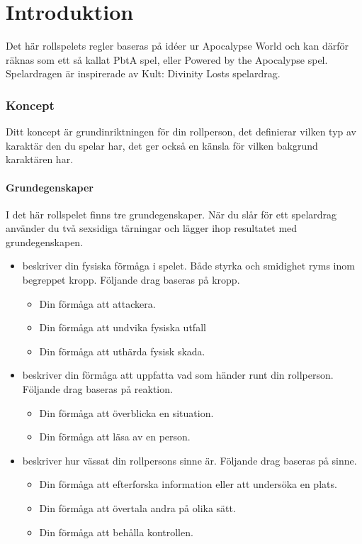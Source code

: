 \newcommand{\MyTitle}{Spelarbok}



\maketitle
\clearpage
\part{Introduktion}
Det här rollspelets regler baseras på idéer ur Apocalypse World och kan därför räknas som ett så kallat PbtA spel, eller Powered by the Apocalypse spel. Spelardragen är inspirerade av Kult: Divinity Losts spelardrag.
\section{Koncept}
Ditt koncept är grundinriktningen för din rollperson, det definierar vilken typ av karaktär den du spelar har, det ger också en känsla för vilken bakgrund karaktären har.
\subsection{Grundegenskaper}
I det här rollspelet finns tre grundegenskaper. När du slår för ett spelardrag använder du två sexsidiga tärningar och lägger ihop resultatet med grundegenskapen.
\begin{itemize}
  \item {} beskriver din fysiska förmåga i spelet. Både styrka och smidighet ryms inom begreppet kropp. Följande drag baseras på kropp.
  \begin{itemize}
    \item Din förmåga att attackera.
    \item Din förmåga att undvika fysiska utfall
    \item Din förmåga att uthärda fysisk skada.
  \end{itemize}
  \item {} beskriver din förmåga att uppfatta vad som händer runt din rollperson. Följande drag baseras på reaktion.
  \begin{itemize}
    \item Din förmåga att överblicka en situation.
    \item Din förmåga att läsa av en person.
  \end{itemize}
  \item {} beskriver hur vässat din rollpersons sinne är. Följande drag baseras på sinne.
  \begin{itemize}
    \item Din förmåga att efterforska information eller att undersöka en plats.
    \item Din förmåga att övertala andra på olika sätt.
    \item Din förmåga att behålla kontrollen.
  \end{itemize}
\end{itemize}
